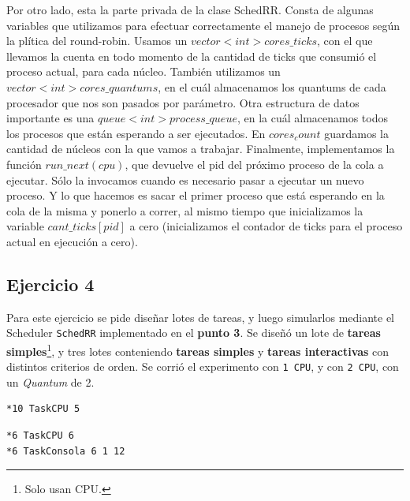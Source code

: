 \documentclass[11pt, a4paper, twoside]{article}
\begin{document}
Por otro lado, esta la parte privada de la clase SchedRR. Consta de algunas variables que utilizamos para efectuar
correctamente el manejo de procesos según la plítica del round-robin. Usamos un $vector<int> cores\_ticks$, 
con el que llevamos la cuenta en todo momento de la cantidad de ticks que consumió el proceso actual, 
para cada núcleo. También utilizamos un $vector<int> cores\_quantums$, en el cuál almacenamos los quantums
de cada procesador que nos son pasados por parámetro. Otra estructura de datos importante es una
$queue<int> process\_queue$, en la cuál almacenamos todos los procesos que están esperando a ser ejecutados.
En $cores_count$ guardamos la cantidad de núcleos con la que vamos a trabajar. Finalmente, implementamos la
función $run\_next(cpu)$, que devuelve el pid del próximo proceso de la cola a ejecutar. Sólo la invocamos
cuando es necesario pasar a ejecutar un nuevo proceso. Y lo que hacemos es sacar el primer proceso que está 
esperando en la cola de la misma y ponerlo a correr, al mismo tiempo que inicializamos la variable
$cant\_ticks[pid]$ a cero (inicializamos el contador de ticks para el proceso actual en ejecución a cero). 









\clearpage
\subsection{Ejercicio 4}

Para este ejercicio se pide diseñar lotes de tareas, y luego simularlos mediante
el Scheduler \texttt{SchedRR} implementado en el \textbf{punto 3}. Se diseñó un
lote de \textbf{tareas  simples}\footnote{Solo usan CPU.}, y tres lotes
conteniendo \textbf{tareas simples} y  \textbf{tareas interactivas} con
distintos criterios de orden. Se corrió el  experimento con \texttt{1 CPU}, y
con \texttt{2 CPU}, con un \emph{Quantum} de 2.

\begin{minipage}[t]{0.4\textwidth}
\begin{Verbatim}[frame=single,framesep=1cm,label=simples.tsk]
*10 TaskCPU 5  
\end{Verbatim}
\end{minipage}
\hfill
\begin{minipage}[t]{0.4\textwidth}
\begin{Verbatim}[frame=single,framesep=1cm,label=interactivas.tsk]
*6 TaskCPU 6
*6 TaskConsola 6 1 12
\end{Verbatim}
\end{minipage}
\end{document}
